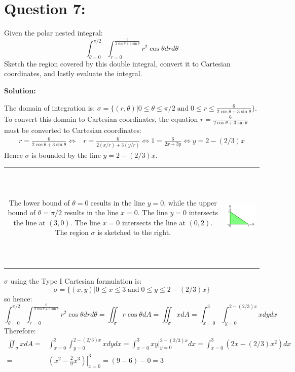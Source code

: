 \documentclass{article}
\newcommand{\at}[1]{\left. #1 \right|}
\newcommand{\dr}[1]{\textcolor{dark_red}{#1}}
\begin{document}
\section*{Question 7:}

Given the polar nested integral:
\[\int_{\theta = 0}^{\pi/2}\int_{r = 0}^{\frac{6}{2\cos\theta + 3\sin\theta}} r^2\cos\theta dr d\theta\]
Sketch the region covered by this double integral, convert it to Cartesian coordinates, and lastly evaluate the integral.

\vspace{5mm}
\dr{\textbf{Solution:}}

\dr{
The domain of integration is: \(\sigma = \{(r,\theta) | 0 \leq \theta \leq \pi/2 \;\text{and}\; 0 \leq r \leq \frac{6}{2\cos\theta + 3\sin\theta}\}\). \\
To convert this domain to Cartesian coordinates, the equation \(r = \frac{6}{2\cos\theta + 3\sin\theta}\) must be converted to Cartesian coordinates:
\begin{align*}
r = \frac{6}{2\cos\theta + 3\sin\theta} 
\iff & r = \frac{6}{2(x/r) + 3(y/r)} 
\iff 1 = \frac{6}{2x + 3y} 
\iff y = 2 - (2/3)x
\end{align*}
Hence \(\sigma\) is bounded by the line \(y = 2 - (2/3)x\). \\
\begin{tabular}{cc}
\parbox{0.6\textwidth}{
The lower bound of \(\theta = 0\) results in the line \(y = 0\), while the upper bound of \(\theta = \pi/2\) results in the line \(x = 0\). 
The line \(y = 0\) intersects the line at \((3,0)\). The line \(x = 0\) intersects the line at \((0,2)\). The region \(\sigma\) is sketched to the right. 
} & \parbox{0.4\textwidth}{
\includegraphics[height = 5cm]{Test_bench_part_3_images/Test_bench_part_3_Solutions_image_2}
}
\end{tabular}
\(\sigma\) using the Type I Cartesian formulation is:
\[\sigma = \{(x,y) | 0 \leq x \leq 3 \;\text{and}\; 0 \leq y \leq 2 - (2/3)x\}\]
so hence:
\[\int_{\theta = 0}^{\pi/2}\int_{r = 0}^{\frac{6}{2\cos\theta + 3\sin\theta}} r^2\cos\theta dr d\theta
= \iint_{\sigma} r\cos\theta dA = \iint_{\sigma} x dA = 
\int_{x = 0}^3 \int_{y = 0}^{2 - (2/3)x} x dydx\]
Therefore:
\begin{align*}
\iint_{\sigma} x dA = & \int_{x = 0}^3 \int_{y = 0}^{2 - (2/3)x} x dydx 
= \int_{x = 0}^3 \at{xy}_{y = 0}^{2 - (2/3)x} dx 
= \int_{x = 0}^3 (2x - (2/3)x^2)dx \\
= & \at{(x^2 - \frac{2}{9}x^3)}_{x = 0}^3 
= (9 - 6) - 0 = 3
\end{align*}
}
\end{document}
